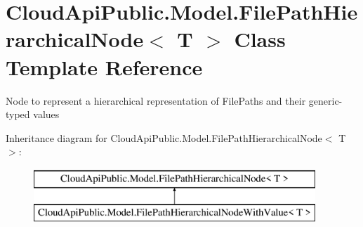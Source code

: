 \hypertarget{class_cloud_api_public_1_1_model_1_1_file_path_hierarchical_node_3_01_t_01_4}{\section{Cloud\-Api\-Public.\-Model.\-File\-Path\-Hierarchical\-Node$<$ T $>$ Class Template Reference}
\label{class_cloud_api_public_1_1_model_1_1_file_path_hierarchical_node_3_01_t_01_4}
}


Node to represent a hierarchical representation of File\-Paths and their generic-\/typed values  


Inheritance diagram for Cloud\-Api\-Public.\-Model.\-File\-Path\-Hierarchical\-Node$<$ T $>$\-:\begin{figure}[H]
\begin{center}
\leavevmode
\includegraphics[height=2.000000cm]{class_cloud_api_public_1_1_model_1_1_file_path_hierarchical_node_3_01_t_01_4}
\end{center}
\end{figure}
